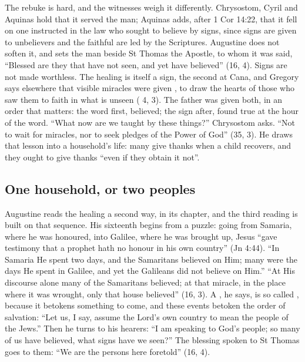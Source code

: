 The rebuke is hard, and the witnesses weigh it differently. Chrysostom, Cyril
and Aquinas hold that it served the man; Aquinas adds,
after 1 Cor 14:22, that it fell on one instructed in the law who sought to
believe by signs, since signs are given to unbelievers and the faithful are led
by the Scriptures. Augustine does not soften it, and sets the man beside St
Thomas the Apostle, to whom it was said, ``Blessed are they that have not seen,
and yet have believed'' (16, 4). Signs are not made worthless. The healing is itself a sign, the second at
Cana, and Gregory says elsewhere that visible miracles were given , to draw the hearts of those
who saw them to faith in what is unseen ( 4, 3).
The father was given both, in an order that matters: the word first, believed;
the sign after, found true at the hour of the word. ``What now are we taught by
these things?'' Chrysostom asks. ``Not to wait for miracles, nor to seek pledges
of the Power of God'' (35, 3). He draws that lesson into a household's life:
many give thanks when a child recovers, and they ought to give thanks ``even if
they obtain it not''.

\subsection{One household, or two peoples}

Augustine reads the healing a second way, in its chapter, and the third reading
is built on that sequence. His sixteenth  begins from a puzzle:
going from Samaria, where he was honoured, into Galilee, where he was brought
up, Jesus ``gave testimony that a prophet hath no honour in his own country''
(Jn 4:44). ``In Samaria He spent two days, and the Samaritans believed on Him;
many were the days He spent in Galilee, and yet the Galileans did not believe on
Him.'' ``At His discourse alone many of the Samaritans believed; at that
miracle, in the place where it was wrought, only that house believed'' (16, 3).
A , he says, is so called , because it
betokens something to come, and these events betoken the order of salvation:
``Let us, I say, assume the Lord's own country to mean the people of the Jews.''
Then he turns to his hearers: ``I am speaking to God's people; so many of us
have believed, what signs have we seen?'' The blessing spoken to St Thomas goes
to them: ``We are the persons here foretold'' (16, 4).

